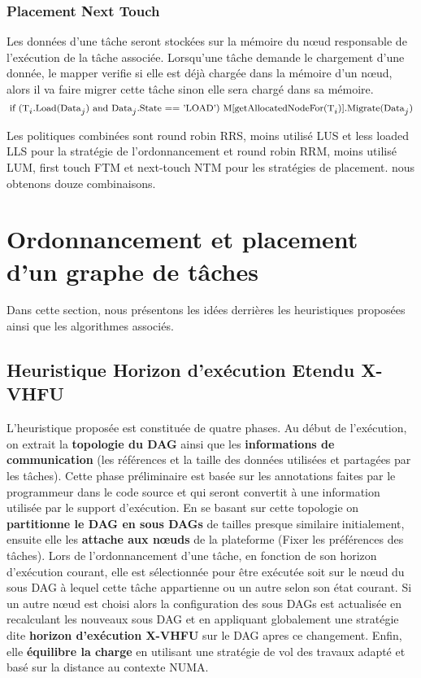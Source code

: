 \subsubsection{Placement Next Touch}
%
Les données d'une tâche seront stockées sur la mémoire du nœud responsable de l'exécution de la tâche associée. Lorsqu’une tâche demande le chargement d'une donnée, le mapper verifie si elle est déjà chargée dans la mémoire d'un nœud, alors il va faire migrer cette tâche sinon elle sera chargé dans sa mémoire.%
\[
{\footnotesize
\text{if (T}_i\text{.Load(Data}_j\text{) and Data}_j\text{.State == 'LOAD') M[getAllocatedNodeFor(T}_i\text{)].Migrate(Data}_j\text{)}
}
\]

Les politiques combinées sont round robin RRS, moins utilisé LUS et less loaded LLS pour la stratégie de l'ordonnancement et round robin RRM, moins utilisé LUM, first touch FTM et next-touch NTM pour les stratégies de placement. nous obtenons douze combinaisons.
\newpage
\section{Ordonnancement et placement d'un graphe de tâches}\label{OPGT}
%
Dans cette section, nous présentons les idées derrières les heuristiques proposées  ainsi que les algorithmes associés.
%
\subsection{Heuristique Horizon d'exécution Etendu X-VHFU}
%
L'heuristique proposée est constituée de quatre phases. 
Au début de l'exécution, on extrait la \textbf{topologie du DAG} ainsi que les \textbf{informations de communication} (les références et la taille des données utilisées et partagées par les tâches). Cette phase préliminaire est basée sur les annotations faites par le programmeur dans le code source et qui seront convertit à une information utilisée par le support d'exécution. En se basant sur cette topologie on \textbf{partitionne le DAG en sous DAGs} de tailles presque similaire initialement,  
ensuite elle les \textbf{attache aux nœuds} de la plateforme (Fixer les préférences des tâches). 
Lors de l'ordonnancement d'une tâche, en fonction de son horizon d'exécution courant, elle est sélectionnée pour être exécutée soit sur le nœud du sous DAG à lequel cette tâche appartienne ou un autre selon son état courant. Si un autre nœud est choisi alors la configuration des sous DAGs est actualisée en recalculant les nouveaux sous DAG et en appliquant globalement une stratégie dite \textbf{horizon d'exécution X-VHFU} sur le DAG apres ce changement. 
Enfin, elle \textbf{équilibre la charge} en utilisant une stratégie de vol des travaux adapté et basé sur la distance au contexte NUMA.
%
